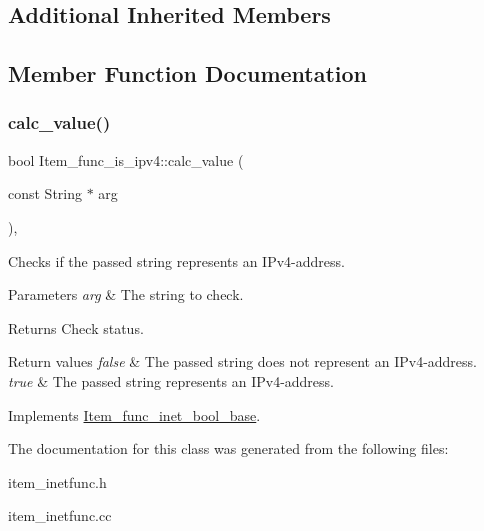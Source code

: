 \subsection*{Additional Inherited Members}


\subsection{Member Function Documentation}
\mbox{\label{classItem__func__is__ipv4_a9af9dc1c9207182c8a075fdc1e9e95e6}} 
\subsubsection{\texorpdfstring{calc\+\_\+value()}{calc\_value()}}
{\footnotesize\ttfamily bool Item\+\_\+func\+\_\+is\+\_\+ipv4\+::calc\+\_\+value (\begin{DoxyParamCaption}\item[{const String $\ast$}]{arg }\end{DoxyParamCaption})\hspace{0.3cm}{\ttfamily [protected]}, {\ttfamily [virtual]}}

Checks if the passed string represents an I\+Pv4-\/address.


\begin{DoxyParams}{Parameters}
{\em arg} & The string to check.\\
\hline
\end{DoxyParams}
\begin{DoxyReturn}{Returns}
Check status. 
\end{DoxyReturn}

\begin{DoxyRetVals}{Return values}
{\em false} & The passed string does not represent an I\+Pv4-\/address. \\
\hline
{\em true} & The passed string represents an I\+Pv4-\/address. \\
\hline
\end{DoxyRetVals}


Implements \mbox{\hyperlink{classItem__func__inet__bool__base}{Item\+\_\+func\+\_\+inet\+\_\+bool\+\_\+base}}.



The documentation for this class was generated from the following files\+:\begin{DoxyCompactItemize}
\item 
item\+\_\+inetfunc.\+h\item 
item\+\_\+inetfunc.\+cc\end{DoxyCompactItemize}
